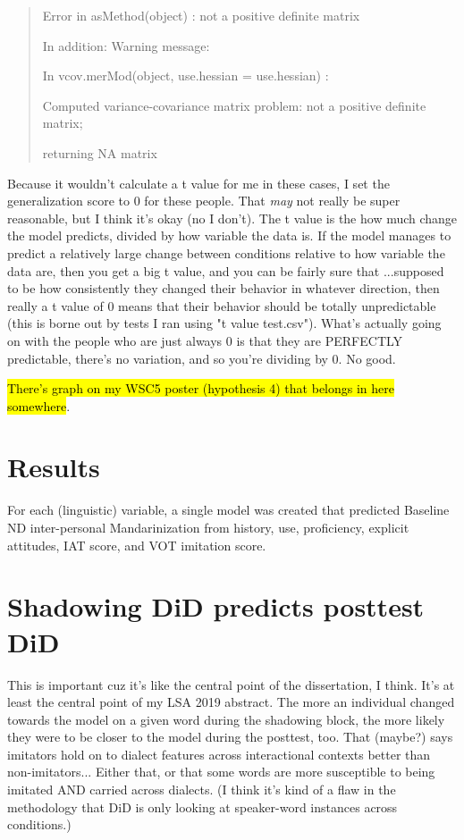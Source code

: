 \begin{quote}
Error in asMethod(object) : not a positive definite matrix

In addition: Warning message:

In vcov.merMod(object, use.hessian = use.hessian) :

Computed variance-covariance matrix problem: not a positive definite matrix;

returning NA matrix
\end{quote}
Because it wouldn't calculate a t value for me in these cases, I set the generalization score to 0 for these people. That \textit{may} not really be super reasonable, but I think it's okay (no I don't). The t value is the how much change the model predicts, divided by how variable the data is. If the model manages to predict a relatively large change between conditions relative to how variable the data are, then you get a big t value, and you can be fairly sure that ...supposed to be how consistently they changed their behavior in whatever direction, then really a t value of 0 means that their behavior should be totally unpredictable (this is borne out by tests I ran using "t value test.csv"). What's actually going on with the people who are just always 0 is that they are PERFECTLY predictable, there's no variation, and so you're dividing by 0. No good.

\hl{There's graph on my WSC5 poster (hypothesis 4) that belongs in here somewhere}.

\section{Results}
\label{sec:externalResults}
For each (linguistic) variable, a single model was created that predicted Baseline ND inter-personal Mandarinization from history, use, proficiency, explicit attitudes, IAT score, and VOT imitation score. 

\section{Shadowing DiD predicts posttest DiD}
This is important cuz it's like the central point of the dissertation, I think. It's at least the central point of my LSA 2019 abstract. The more an individual changed towards the model on a given word during the shadowing block, the more likely they were to be closer to the model during the posttest, too. That (maybe?) says imitators hold on to dialect features across interactional contexts better than non-imitators... Either that, or that some words are more susceptible to being imitated AND carried across dialects. (I think it's kind of a flaw in the methodology that DiD is only looking at speaker-word instances across conditions.)

